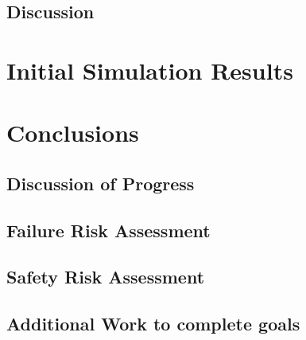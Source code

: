 \documentclass[a4paper,12pt]{report}
\begin{document}
\section{Discussion}

\chapter{Initial Simulation Results}


\chapter{Conclusions}
\section{Discussion of Progress}
\section{Failure Risk Assessment}
\section{Safety Risk Assessment}
\section{Additional Work to complete goals}
\end{document}
